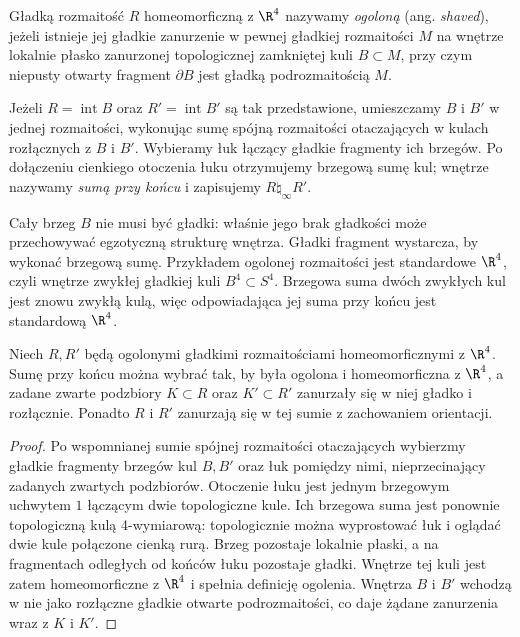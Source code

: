 \begin{definicja}
\label{def:egzotyczne-r4-shaved}
Gładką rozmaitość $R$ homeomorficzną z $\R^4$
nazywamy \emph{ogoloną} (ang. \emph{shaved}),
jeżeli istnieje jej
gładkie zanurzenie w pewnej gładkiej rozmaitości
$M$ na wnętrze lokalnie płasko zanurzonej
topologicznej zamkniętej kuli $B\subset M$, przy
czym niepusty otwarty fragment $\partial B$ jest
gładką podrozmaitością $M$.

Jeżeli $R=\operatorname{int}B$ oraz
$R'=\operatorname{int}B'$ są tak przedstawione,
umieszczamy $B$ i $B'$ w jednej rozmaitości,
wykonując sumę spójną rozmaitości otaczających
w kulach rozłącznych z $B$ i $B'$.
Wybieramy łuk łączący gładkie fragmenty ich
brzegów. Po dołączeniu cienkiego otoczenia łuku
otrzymujemy brzegową sumę kul; wnętrze nazywamy
\emph{sumą przy końcu} i zapisujemy
$R\mathbin{\natural_\infty}R'$.
\end{definicja}

Cały brzeg $B$ nie musi być gładki: właśnie jego
brak gładkości może przechowywać egzotyczną
strukturę wnętrza. Gładki fragment wystarcza,
by wykonać brzegową sumę. Przykładem ogolonej
rozmaitości jest standardowe $\R^4$, czyli
wnętrze zwykłej gładkiej kuli $B^4\subset S^4$.
Brzegowa suma dwóch zwykłych kul jest znowu
zwykłą kulą, więc odpowiadająca jej suma przy
końcu jest standardową $\R^4$.

\begin{stwierdzenie}
\label{prop:egzotyczne-r4-suma}
Niech $R,R'$ będą ogolonymi gładkimi rozmaitościami
homeomorficznymi z $\R^4$. Sumę przy końcu można
wybrać tak, by była ogolona i homeomorficzna z
$\R^4$, a zadane zwarte podzbiory $K\subset R$ oraz
$K'\subset R'$ zanurzały się w niej gładko i
rozłącznie. Ponadto $R$ i $R'$ zanurzają się w
tej sumie z zachowaniem orientacji.
\end{stwierdzenie}
\begin{proof}
Po wspomnianej sumie spójnej rozmaitości otaczających
wybierzmy gładkie fragmenty brzegów kul $B,B'$
oraz łuk pomiędzy nimi, nieprzecinający zadanych
zwartych podzbiorów. Otoczenie łuku jest
jednym brzegowym uchwytem $1$ łączącym dwie
topologiczne kule. Ich brzegowa suma jest ponownie
topologiczną kulą $4$-wymiarową: topologicznie
można wyprostować łuk i oglądać dwie kule
połączone cienką rurą. Brzeg pozostaje lokalnie
płaski, a na fragmentach odległych od końców
łuku pozostaje gładki. Wnętrze tej kuli jest
zatem homeomorficzne z $\R^4$ i spełnia definicję
ogolenia. Wnętrza $B$ i $B'$ wchodzą w nie jako
rozłączne gładkie otwarte podrozmaitości, co daje
żądane zanurzenia wraz z $K$ i $K'$.
\end{proof}

